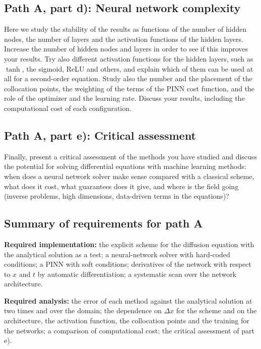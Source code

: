 \documentclass[11pt,a4paper]{article}
\begin{document}
\subsection*{Path A, part d): Neural network complexity}

Here we study the stability of the results as functions of the number of
hidden nodes, the number of layers and the activation functions of the
hidden layers.  Increase the number of hidden nodes and layers in order to
see if this improves your results.  Try also different activation functions
for the hidden layers, such as $\tanh$, the sigmoid, ReLU and others, and
explain which of them can be used at all for a second-order equation.  Study
also the number and the placement of the collocation points, the weighting of
the terms of the PINN cost function, and the role of the optimizer and the
learning rate.  Discuss your results, including the computational cost of
each configuration.

\subsection*{Path A, part e): Critical assessment}

Finally, present a critical assessment of the methods you have studied and
discuss the potential for solving differential equations with machine
learning methods: when does a neural network solver make sense compared with
a classical scheme, what does it cost, what guarantees does it give, and
where is the field going (inverse problems, high dimensions, data-driven
terms in the equations)?

\subsection*{Summary of requirements for path A}

\textbf{Required implementation:} the explicit scheme for the diffusion
equation with the analytical solution as a test; a neural-network solver
with hard-coded conditions; a PINN with soft conditions; derivatives of the
network with respect to $x$ and $t$ by automatic differentiation; a
systematic scan over the network architecture.

\textbf{Required analysis:} the error of each method against the analytical
solution at two times and over the domain; the dependence on $\Delta x$ for
the scheme and on the architecture, the activation function, the collocation
points and the training for the networks; a comparison of computational
cost; the critical assessment of part e).
\end{document}
